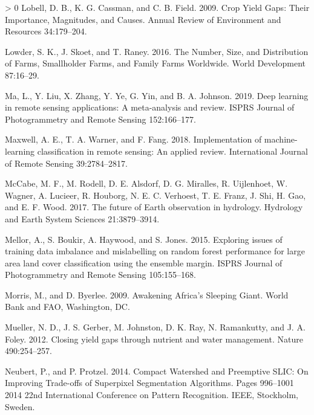\documentclass[11pt,a4paper]{article}
\newlength{\cslhangindent}
\newenvironment{CSLReferences}[3] %
 {%
  \setlength{\parindent}{0pt}
  \ifodd #1 \everypar{\setlength{\hangindent}{\cslhangindent}}\ignorespaces\fi
  \ifnum #2 > 0
  \setlength{\parskip}{#2\baselineskip}
  \fi
 }%
 {}
\begin{document}
\begin{CSLReferences}{1}{0}
\leavevmode\hypertarget{ref-lobellCropYieldGaps2009}{}%
Lobell, D. B., K. G. Cassman, and C. B. Field. 2009. Crop {Yield Gaps}:
{Their Importance}, {Magnitudes}, and {Causes}. Annual Review of
Environment and Resources 34:179--204.

\leavevmode\hypertarget{ref-LowderNumberSizeDistribution2016}{}%
Lowder, S. K., J. Skoet, and T. Raney. 2016. The {Number}, {Size}, and
{Distribution} of {Farms}, {Smallholder Farms}, and {Family Farms
Worldwide}. World Development 87:16--29.

\leavevmode\hypertarget{ref-maDeepLearningRemote2019}{}%
Ma, L., Y. Liu, X. Zhang, Y. Ye, G. Yin, and B. A. Johnson. 2019. Deep
learning in remote sensing applications: {A} meta-analysis and review.
ISPRS Journal of Photogrammetry and Remote Sensing 152:166--177.

\leavevmode\hypertarget{ref-MaxwellImplementationmachinelearningclassification2018}{}%
Maxwell, A. E., T. A. Warner, and F. Fang. 2018. Implementation of
machine-learning classification in remote sensing: An applied review.
International Journal of Remote Sensing 39:2784--2817.

\leavevmode\hypertarget{ref-McCabefutureEarthobservation2017}{}%
McCabe, M. F., M. Rodell, D. E. Alsdorf, D. G. Miralles, R. Uijlenhoet,
W. Wagner, A. Lucieer, R. Houborg, N. E. C. Verhoest, T. E. Franz, J.
Shi, H. Gao, and E. F. Wood. 2017. The future of {Earth} observation in
hydrology. Hydrology and Earth System Sciences 21:3879--3914.

\leavevmode\hypertarget{ref-mellorExploringIssuesTraining2015}{}%
Mellor, A., S. Boukir, A. Haywood, and S. Jones. 2015. Exploring issues
of training data imbalance and mislabelling on random forest performance
for large area land cover classification using the ensemble margin.
ISPRS Journal of Photogrammetry and Remote Sensing 105:155--168.

\leavevmode\hypertarget{ref-morrisAwakeningAfricaSleeping2009}{}%
Morris, M., and D. Byerlee. 2009. Awakening {Africa}'s {Sleeping Giant}.
{World Bank and FAO}, {Washington, DC}.

\leavevmode\hypertarget{ref-muellerClosingYieldGaps2012}{}%
Mueller, N. D., J. S. Gerber, M. Johnston, D. K. Ray, N. Ramankutty, and
J. A. Foley. 2012. Closing yield gaps through nutrient and water
management. Nature 490:254--257.

\leavevmode\hypertarget{ref-neubertCompactWatershedPreemptive2014}{}%
Neubert, P., and P. Protzel. 2014. Compact {Watershed} and {Preemptive
SLIC}: {On Improving Trade}-offs of {Superpixel Segmentation
Algorithms}. Pages 996--1001 2014 22nd {International Conference} on
{Pattern Recognition}. {IEEE}, {Stockholm, Sweden}.


\end{CSLReferences}
\end{document}

